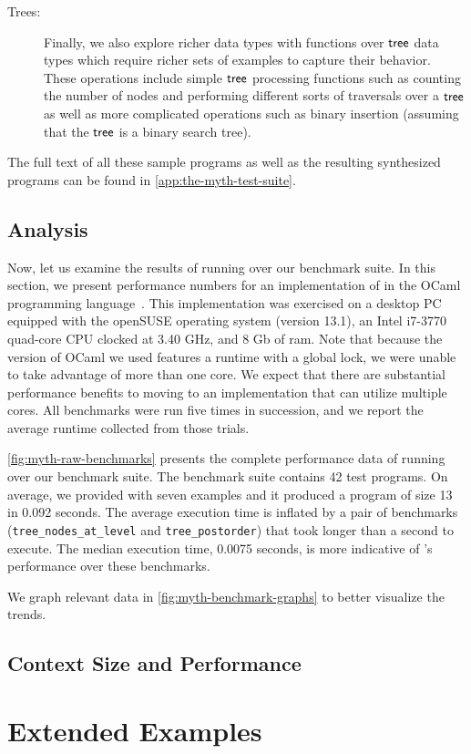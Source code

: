 \begin{description}
  \item[Trees:]
    Finally, we also explore richer data types with functions over $\mathsf{tree}$ data types which require richer sets of examples to capture their behavior.
    These operations include simple $\mathsf{tree}$ processing functions such as counting the number of nodes and performing different sorts of traversals over a $\mathsf{tree}$ as well as more complicated operations such as binary insertion (assuming that the $\mathsf{tree}$ is a binary search tree).
\end{description}

The full text of all these sample \myth{} programs as well as the resulting synthesized programs can be found in \autoref{app:the-myth-test-suite}.

\subsection{Analysis}
\label{subsec:analysis}

Now, let us examine the results of running \myth{} over our benchmark suite.
In this section, we present performance numbers for an implementation of \myth{} in the OCaml programming language~.
This implementation was exercised on a desktop PC equipped with the openSUSE operating system (version 13.1), an Intel i7-3770 quad-core CPU clocked at 3.40 GHz, and 8 Gb of ram.
Note that because the version of OCaml we used features a runtime with a global lock, we were unable to take advantage of more than one core.
We expect that there are substantial performance benefits to moving to an implementation that can utilize multiple cores.
All benchmarks were run five times in succession, and we report the average runtime collected from those trials.





\autoref{fig:myth-raw-benchmarks} presents the complete performance data of running \myth{} over our benchmark suite.
The benchmark suite contains 42 test programs.
On average, we provided \myth{} with seven examples and it produced a program of size 13 in 0.092 seconds.
The average execution time is inflated by a pair of benchmarks (\texttt{tree\_nodes\_at\_level} and \texttt{tree\_postorder}) that took longer than a second to execute.
The median execution time, 0.0075 seconds, is more indicative of \myth{}'s performance over these benchmarks.

We graph relevant data in \autoref{fig:myth-benchmark-graphs} to better visualize the trends.

\subsection{Context Size and Performance}
\label{subsec:context-size-and-performance}

\section{Extended Examples}
\label{sec:extended-examples}
